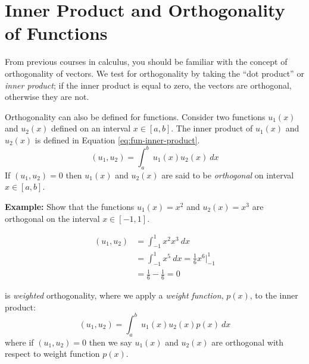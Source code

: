\section{Inner Product and Orthogonality of Functions}
From previous courses in calculus, you should be familiar with the concept of orthogonality of vectors.  We test for orthogonality by taking the ``dot product'' or \emph{inner product}; if the inner product is equal to zero, the vectors are orthogonal, otherwise they are not.

Orthogonality can also be defined for functions. Consider two functions $u_1(x)$ and $u_2(x)$ defined on an interval $x\in[a,b]$.  The inner product of $u_1(x)$ and $u_2(x)$ is defined in Equation \ref{eq:fun-inner-product}.
\begin{equation}
\left(u_1,u_2\right) = \int_{a}^{b} \ u_1(x)u_2(x) \ dx
\label{eq:fun-inner-product}
\end{equation}
If $\left(u_1,u_2\right)=0$ then $u_1(x)$ and $u_2(x)$ are said to be \emph{orthogonal} on interval $x\in[a,b]$.

\vspace{0.5cm}

\noindent\textbf{Example:} Show that the functions $u_1(x)=x^2$ and $u_2(x)=x^3$ are orthogonal on the interval $x \in[-1,1]$.

\vspace{0.5cm}

\begin{align*}
\left(u_1,u_2\right) &= \int_{-1}^{1} x^2 x^3 \ dx \\
&= \int_{-1}^1 x^5 \ dx = \frac{1}{6}x^6\Bigr|_{-1}^{1} \\
&=\frac{1}{6} - \frac{1}{6} = 0
\end{align*}

 is \emph{weighted} orthogonality, where we apply a \emph{weight function}, $p(x)$, to the inner product:
\begin{equation}
\left(u_1,u_2\right) = \int_a^b \ u_1(x)u_2(x)p(x) \ dx
\label{eq:weighted-inner-product}
\end{equation}
where if $\left(u_1,u_2\right)=0$ then we say $u_1(x)$ and $u_2(x)$ are orthogonal with respect to weight function $p(x)$.

